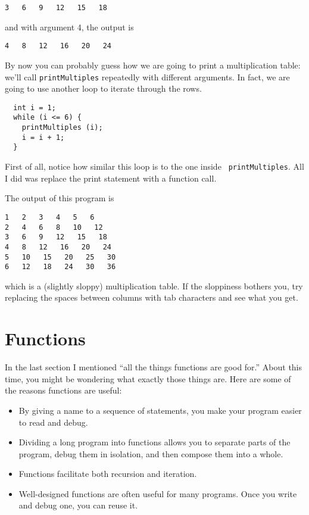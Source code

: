 \begin{lstlisting}
3   6   9   12   15   18
\end{lstlisting}
%
and with argument 4, the output is

\begin{lstlisting}
4   8   12   16   20   24 
\end{lstlisting}
%
By now you can probably guess how we are going to print a
multiplication table: we'll call {\tt printMultiples} repeatedly with
different arguments.  In fact, we are going to use another loop to
iterate through the rows.

\begin{lstlisting}
  int i = 1;
  while (i <= 6) {
    printMultiples (i);
    i = i + 1;
  }    
\end{lstlisting}
%
First of all, notice how similar this loop is to the one inside {\tt
printMultiples}.  All I did was replace the print statement with a
function call.

The output of this program is

\begin{lstlisting}
1   2   3   4   5   6   
2   4   6   8   10   12   
3   6   9   12   15   18   
4   8   12   16   20   24   
5   10   15   20   25   30   
6   12   18   24   30   36   
\end{lstlisting}
%
which is a (slightly sloppy) multiplication table.  If the
sloppiness bothers you, try replacing the spaces between
columns with tab characters and see what you get.

\section{Functions}

In the last section I mentioned ``all the things functions
are good for.''  About this time, you might be wondering
what exactly those things are.  Here are some of the reasons
functions are useful:

\begin{itemize}

\item By giving a name to a sequence of statements, you make
your program easier to read and debug.

\item Dividing a long program into functions allows you to
separate parts of the program, debug them in isolation, and
then compose them into a whole.

\item Functions facilitate both recursion and iteration.

\item Well-designed functions are often useful for many programs.
Once you write and debug one, you can reuse it.

\end{itemize}

